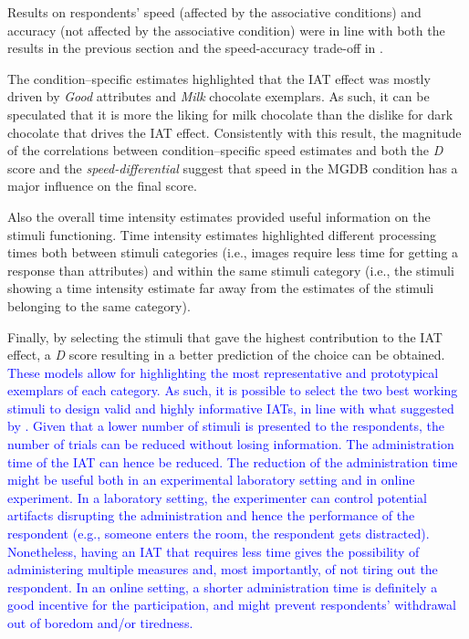 \documentclass[12pt]{book}
\begin{document}
Results on respondents' speed (affected by the associative conditions) and accuracy (not affected by the associative condition) were in line with both the results in the previous section and the speed-accuracy trade-off in .  

The condition--specific estimates highlighted that the IAT effect was mostly driven by \emph{Good} attributes and \emph{Milk} chocolate exemplars. As such, it can be speculated that it is more the liking for milk chocolate than the dislike for dark chocolate that drives the IAT effect. 
Consistently with this result, the magnitude of the correlations between condition--specific speed estimates and both the \emph{D} score and the \emph{speed-differential} suggest that speed in the MGDB condition has a major influence on the final score. 

Also the overall time intensity estimates provided useful information on the stimuli functioning. 
Time intensity estimates highlighted different processing times both between stimuli categories (i.e., images require
less time for getting a response than attributes) and within the same stimuli category (i.e., the
stimuli showing a time intensity estimate far away from the estimates of the stimuli belonging
to the same category). 

Finally, by selecting the stimuli that gave the highest contribution to the IAT effect, a \emph{D} score resulting in a better prediction of the choice can be obtained. 
\textcolor{blue}{These models allow for highlighting the most representative and prototypical exemplars of each category. As such, it is possible to select the two best working stimuli to design valid and highly informative IATs, in line with what suggested by .
	Given that a lower number of stimuli is presented to the respondents, the number of trials can be reduced without losing information. The administration time of the IAT can hence be reduced. 
	The reduction of the administration time might be useful both in an experimental laboratory setting and in online experiment. 
	In a laboratory setting, the experimenter can control potential artifacts disrupting the administration and hence the performance of the respondent (e.g., someone enters the room, the respondent gets distracted).  Nonetheless, having an IAT that requires less time gives the possibility of administering multiple measures and, most importantly, of not tiring out the respondent. 
	In an online setting, a shorter administration time is definitely a good incentive for the participation, and might prevent respondents' withdrawal out of boredom and/or tiredness. 
}
\end{document}
